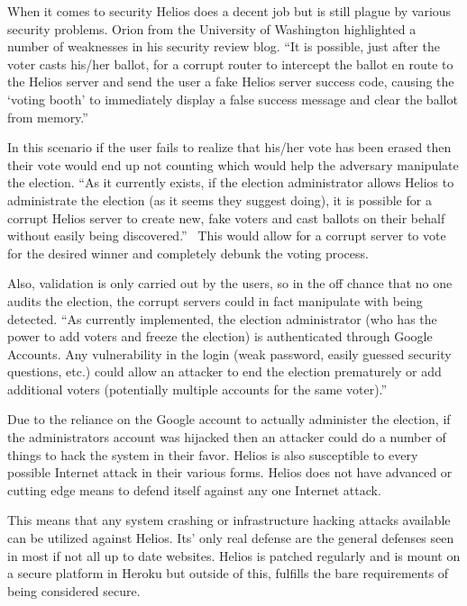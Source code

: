 When it comes to security Helios does a decent job but is still plague by various security problems. Orion from the University of Washington highlighted a number of weaknesses in his security review blog. ``It is possible, just after the voter casts his/her ballot, for a corrupt router to intercept the ballot en route to the Helios server and send the user a fake Helios server success code, causing the `voting booth' to immediately display a false success message and clear the ballot from memory.''~\cite{orion2009}

In this scenario if the user fails to realize that his/her vote has been erased then their vote would end up not counting which would help the adversary manipulate the election. ``As it currently exists, if the election administrator allows Helios to administrate the election (as it seems they suggest doing), it is possible for a corrupt Helios server to create new, fake voters and cast ballots on their behalf without easily being discovered.''~\cite{orion2009} This would allow for a corrupt server to vote for the desired winner and completely debunk the voting process.

Also, validation is only carried out by the users, so in the off chance that no one audits the election, the corrupt servers could in fact manipulate with being detected. ``As currently implemented, the election administrator (who has the power to add voters and freeze the election) is authenticated through Google Accounts. Any vulnerability in the login (weak password, easily guessed security questions, etc.) could allow an attacker to end the election prematurely or add additional voters (potentially multiple accounts for the same voter).''~\cite{orion2009}

Due to the reliance on the Google account to actually administer the election, if the administrators account was hijacked then an attacker could do a number of things to hack the system in their favor. Helios is also susceptible to every possible Internet attack in their various forms. Helios does not have advanced or cutting edge means to defend itself against any one Internet attack.

This means that any system crashing or infrastructure hacking attacks available can be utilized against Helios. Its' only real defense are the general defenses seen in most if not all up to date websites. Helios is patched regularly and is mount on a secure platform in Heroku but outside of this, fulfills the bare requirements of being considered secure.

